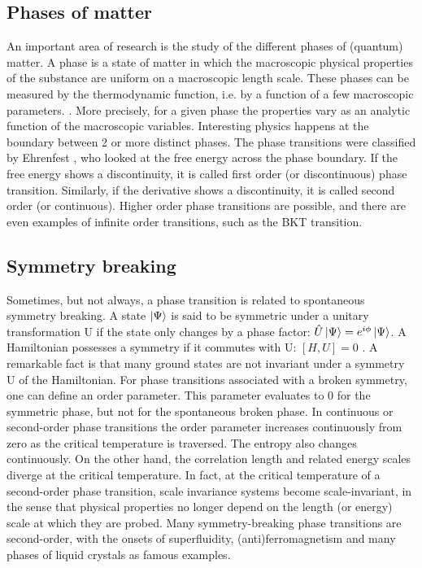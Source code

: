 \subsection{Phases of matter}

An important area of research is the study of the different phases of (quantum) matter. A phase is a state of matter in which the macroscopic physical properties of the substance are uniform on a macroscopic length scale. These phases can be measured by the thermodynamic function, i.e. by a function of a few macroscopic parameters. \cite{Nishimori2011}. More precisely, for a given phase the properties vary as an analytic function of the macroscopic variables.
Interesting physics happens at the boundary between 2 or more distinct phases. The phase transitions were classified by Ehrenfest \cite{Jaeger1998}, who looked at the free energy across the phase boundary. If the free energy shows a discontinuity, it is called first order (or discontinuous) phase transition. Similarly, if the derivative shows a discontinuity, it is called second order (or continuous). Higher order phase transitions are possible, and there are even examples of infinite order transitions, such as the BKT transition.

\subsection{Symmetry breaking}

Sometimes, but not always, a phase transition is  related to spontaneous symmetry breaking. A state $\ket{\Psi}$ is said to be symmetric under a unitary transformation U if the state only changes by a phase factor: $ \hat{U} \ket{\Psi} = e^{i \phi} \ket{\Psi} $. A Hamiltonian possesses a symmetry if it commutes with U: $ [H,U]=0$  \cite{Beekman2019}. A remarkable fact is that many ground states are not invariant under a symmetry U of the Hamiltonian.
For phase transitions associated with a broken symmetry, one can define an order parameter. This parameter evaluates to 0 for the symmetric phase, but not for the spontaneous broken phase.
In continuous or second-order phase transitions the order parameter increases continuously from zero as the critical temperature is traversed. The entropy also changes continuously. On the other hand, the correlation length and related energy scales diverge at the critical temperature. In fact, at the critical temperature of a second-order phase transition, scale invariance systems become scale-invariant, in the sense that physical properties no longer depend on the length (or energy) scale at which they are probed. Many symmetry-breaking phase transitions are second-order, with the onsets of superfluidity, (anti)ferromagnetism and many phases of liquid crystals as famous examples\cite{Beekman2019}.

